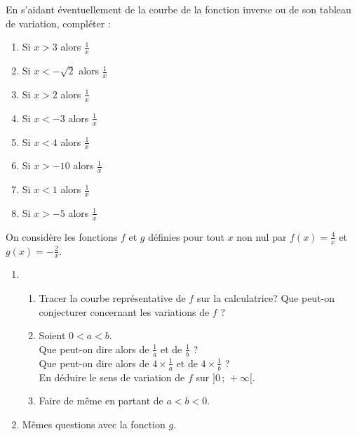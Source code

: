\begin{exo}
 En s'aidant \'eventuellement de la courbe de la fonction inverse ou de son tableau de variation, compl\'eter :
  \vspace{-1em}\begin{multicols}{3}\begin{enumerate}
  \item Si $x>3$ alors \dotfill $\frac{1}{x}$ \dotfill
  \item Si $x<-\sqrt{2}$ alors \dotfill $\frac{1}{x}$ \dotfill
  \item Si $x>2$ alors \dotfill $\frac{1}{x}$ \dotfill
  \item Si $x<-3$ alors \dotfill $\frac{1}{x}$ \dotfill
  \item Si $x<4$ alors \dotfill $\frac{1}{x}$ \dotfill
  \item Si $x>-10$ alors \dotfill $\frac{1}{x}$ \dotfill
  \item Si $x<1$ alors \dotfill $\frac{1}{x}$ \dotfill
  \item Si $x>-5$ alors \dotfill $\frac{1}{x}$ \dotfill
 \end{enumerate}\end{multicols}\vspace{-1em}
\end{exo}

\begin{exo}
On consid\`ere les fonctions $f$ et $g$ d\'efinies pour tout $x$ non nul par $f(x)=\frac{4}{x}$ et $g(x)=-\frac{2}{x}$.
\begin{enumerate}
 \item \begin{enumerate}
        \item Tracer la courbe repr\'esentative de $f$ sur la calculatrice? Que peut-on conjecturer concernant les variations de $f$ ?
	\item Soient $0<a<b$.\\
	      Que peut-on dire alors de $\frac{1}{a}$ et de $\frac{1}{b}$ ?\\
	      Que peut-on dire alors de $4\times\frac{1}{a}$ et de $4\times\frac{1}{b}$ ?\\
	      En d\'eduire le sens de variation de $f$ sur $]0\,;\,+\infty[$.
	\item Faire de m\^eme en partant de $a<b<0$.
       \end{enumerate}
 \item M\^emes questions avec la fonction $g$.
\end{enumerate}
\end{exo}

